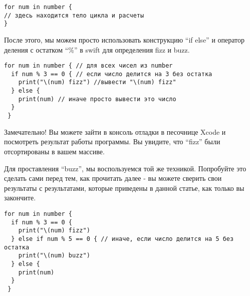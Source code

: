 \vspace{\baselineskip}

\begin{tcolorbox} 
\begin{verbatim}
for num in number {
// здесь находится тело цикла и расчеты
}
\end{verbatim}
\end{tcolorbox}

\vspace{\baselineskip}

После этого, мы можем просто использовать конструкцию “if else” и оператор деления с остатком “\%” в swift для определения fizz и buzz.

\vspace{\baselineskip}

\begin{tcolorbox} 
\begin{verbatim}
for num in number { // для всех чисел из number
  if num % 3 == 0 { // если число делится на 3 без остатка
    print("\(num) fizz") //вывести "\(num) fizz"
  } else {
    print(num) // иначе просто вывести это число
  }
 }
\end{verbatim}
\end{tcolorbox}

\vspace{\baselineskip}

Замечательно! Вы можете зайти в консоль отладки в песочнице Xcode и посмотреть результат работы программы. Вы увидите, что “fizz” были отсортированы в вашем массиве.

\vspace{\baselineskip}

Для проставления “buzz”, мы воспользуемся той же техникой. Попробуйте это сделать сами перед тем, как прочитать далее - вы можете сверить свои результаты с результатами, которые приведены в данной статье, как только вы закончите.

\vspace{\baselineskip}

\begin{tcolorbox} 
\begin{verbatim}
for num in number {
  if num % 3 == 0 {
    print("\(num) fizz")
  } else if num % 5 == 0 { // иначе, если число делится на 5 без остатка
    print("\(num) buzz")
  } else {
    print(num)
  }
 }
\end{verbatim}
\end{tcolorbox}

\vspace{\baselineskip}

